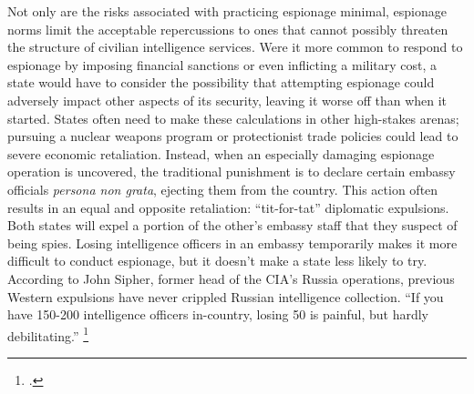 \documentclass[12pt]{extarticle}
\begin{document}


Not only are the risks associated with practicing espionage minimal, espionage norms limit the acceptable repercussions to ones that cannot possibly threaten the structure of civilian intelligence services. Were it more common to respond to espionage by imposing financial sanctions or even inflicting a military cost, a state would have to consider the possibility that attempting espionage could adversely impact other aspects of its security, leaving it worse off than when it started. States often need to make these calculations in other high-stakes arenas; pursuing a nuclear weapons program or protectionist trade policies could lead to severe economic retaliation. Instead, when an especially damaging espionage operation is uncovered, the traditional punishment is to declare certain embassy officials \emph{persona non grata}, ejecting them from the country. This action often results in an equal and opposite retaliation: \enquote{tit-for-tat} diplomatic expulsions. Both states will expel a portion of the other's embassy staff that they suspect of being spies. Losing intelligence officers in an embassy temporarily makes it more difficult to conduct espionage, but it doesn't make a state less likely to try. According to John Sipher, former head of the CIA's Russia operations, previous Western expulsions have never crippled Russian intelligence collection. \enquote{If you have 150-200 intelligence officers in-country, losing 50 is painful, but hardly debilitating.} \footcite{dettmer_united_2018}
\end{document}
